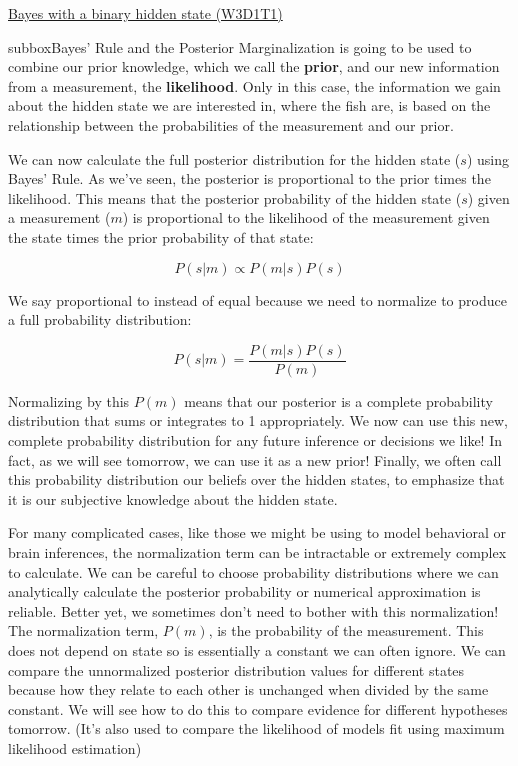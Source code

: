 \begin{textbox}{\href{https://compneuro.neuromatch.io/tutorials/W3D1_BayesianDecisions/student/W3D1_Tutorial1.html}{Bayes with a binary hidden state (W3D1T1)} }
\begin{subbox}{subbox}{Bayes' Rule and the Posterior}
\scriptsize
Marginalization is going to be used to combine our prior knowledge, which we call the \textbf{prior}, and our new information from a measurement, the \textbf{likelihood}. Only in this case, the information we gain about the hidden state we are interested in, where the fish are, is based on the relationship between the probabilities of the measurement and our prior. 

We can now calculate the full posterior distribution for the hidden state ($s$) using Bayes' Rule. As we've seen, the posterior is proportional to the prior times the likelihood. This means that the posterior probability of the hidden state ($s$) given a measurement ($m$) is proportional to the likelihood of the measurement given the state times the prior probability of that state:

\begin{equation}
P(s | m) \propto P(m | s) P(s)
\end{equation}

We say proportional to instead of equal because we need to normalize to produce a full probability distribution:

\begin{equation}
P(s | m) = \frac{P(m | s) P(s)}{P(m)}
\end{equation}

Normalizing by this $P(m)$ means that our posterior is a complete probability distribution that sums or integrates to 1 appropriately. We now can use this new, complete probability distribution for any future inference or decisions we like! In fact, as we will see tomorrow, we can use it as a new prior! Finally, we often call this probability distribution our beliefs over the hidden states, to emphasize that it is our subjective knowledge about the hidden state.

For many complicated cases, like those we might be using to model behavioral or brain inferences, the normalization term can be intractable or extremely complex to calculate. We can be careful to choose probability distributions where we can analytically calculate the posterior probability or numerical approximation is reliable. Better yet, we sometimes don't need to bother with this normalization! The normalization term, $P(m)$, is the probability of the measurement. This does not depend on state so is essentially a constant we can often ignore. We can compare the unnormalized posterior distribution values for different states because how they relate to each other is unchanged when divided by the same constant. We will see how to do this to compare evidence for different hypotheses tomorrow. (It's also used to compare the likelihood of models fit using maximum likelihood estimation)


\end{subbox}
\end{textbox}

